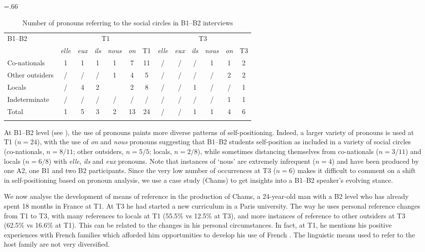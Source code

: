 \documentclass[output=paper]{langscibook}
\begin{document}
\begin{table}
\tabcolsep=.66\tabcolsep
\begin{tabular}{lcccccccccccc}
\lsptoprule
 {B1–B2} & \multicolumn{6}{c}{{T1}}  & \multicolumn{6}{c}{{T3}}\\\cmidrule(lr){2-7}\cmidrule(lr){8-13}
& {\textit{elle}} & {\textit{eux}} & {\textit{ils}} & {\textit{nous}} & {\textit{on}} & {T1} & {\textit{elle}} & {\textit{eux}} & {\textit{ils}} & {\textit{nous}} & {\textit{on}} & {T3}\\
\midrule
{Co-nationals} & 1 & 1 & 1 & 1 & 7 & 11 & / & / & / & 1 & 1 & 2\\
{Other outsiders} & / & / & / & 1 & 4 & 5 & / & / & / & / & 2 & 2\\
{Locals} & / & 4 & 2 &  & 2 & 8 & / & / & 1 & / & / & 1\\
{Indeterminate} & / & / & / & / & / & / & / & / & / & / & 1 & 1\\
\midrule
{Total} & 1 & 5 & 3 & 2 & 13 & 24 & / & / & 1 & 1 & 4 & 6\\
\lspbottomrule
\end{tabular}
\caption{Number of pronouns referring to the social circles in B1–B2 interviews\label{tab:saddour:7}}
\end{table}

At B1–B2 level (see ), the use of pronouns paints more diverse patterns of self-positioning. Indeed, a larger variety of pronouns is used at T1 ($n=24$), with the use of \textit{on} and \textit{nous} pronouns suggesting that B1–B2 students self-position as included in a variety of social circles (co-nationals, $n=8/11$; other outsiders, $n=5/5$; locals, $n=2/8$), while sometimes distancing themselves from co-nationals ($n=3/11$) and locals ($n=6/8$) with \textit{elle}, \textit{ils} and \textit{eux} pronouns. Note that instances of ‘nous’ are extremely infrequent ($n=4$) and have been produced by one A2, one B1 and two B2 participants. Since the very low number of occurrences at T3 ($n=6$) makes it difficult to comment on a shift in self-positioning based on pronoun analysis, we use a case study (Chams) to get insights into a B1–B2 speaker’s evolving stance.

We now analyse the development of means of reference in the production of Chams, a 24-year-old man with a B2 level who has already spent 18 months in France at T1. At T3 he had started a new curriculum in a Paris university. The way he uses personal reference changes from T1 to T3, with many references to locals at T1 (55.5\% vs 12.5\% at T3), and more instances of reference to other outsiders at T3 (62.5\% vs 16.6\% at T1). This can be related to the changes in his personal circumstances. In fact, at T1, he mentions his positive experiences with French families which afforded him opportunities to develop his use of French . The linguistic means used to refer to the host family are not very diversified.
\end{document}
